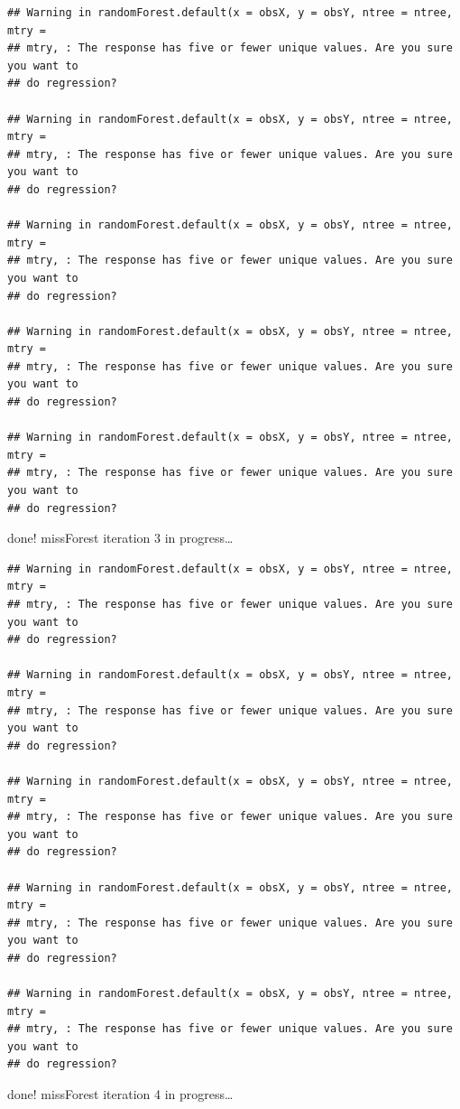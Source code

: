 \documentclass[
]{article}
\begin{document}
\begin{verbatim}
## Warning in randomForest.default(x = obsX, y = obsY, ntree = ntree, mtry =
## mtry, : The response has five or fewer unique values. Are you sure you want to
## do regression?

## Warning in randomForest.default(x = obsX, y = obsY, ntree = ntree, mtry =
## mtry, : The response has five or fewer unique values. Are you sure you want to
## do regression?

## Warning in randomForest.default(x = obsX, y = obsY, ntree = ntree, mtry =
## mtry, : The response has five or fewer unique values. Are you sure you want to
## do regression?

## Warning in randomForest.default(x = obsX, y = obsY, ntree = ntree, mtry =
## mtry, : The response has five or fewer unique values. Are you sure you want to
## do regression?

## Warning in randomForest.default(x = obsX, y = obsY, ntree = ntree, mtry =
## mtry, : The response has five or fewer unique values. Are you sure you want to
## do regression?
\end{verbatim}

done! missForest iteration 3 in progress\ldots{}

\begin{verbatim}
## Warning in randomForest.default(x = obsX, y = obsY, ntree = ntree, mtry =
## mtry, : The response has five or fewer unique values. Are you sure you want to
## do regression?

## Warning in randomForest.default(x = obsX, y = obsY, ntree = ntree, mtry =
## mtry, : The response has five or fewer unique values. Are you sure you want to
## do regression?

## Warning in randomForest.default(x = obsX, y = obsY, ntree = ntree, mtry =
## mtry, : The response has five or fewer unique values. Are you sure you want to
## do regression?

## Warning in randomForest.default(x = obsX, y = obsY, ntree = ntree, mtry =
## mtry, : The response has five or fewer unique values. Are you sure you want to
## do regression?

## Warning in randomForest.default(x = obsX, y = obsY, ntree = ntree, mtry =
## mtry, : The response has five or fewer unique values. Are you sure you want to
## do regression?
\end{verbatim}

done! missForest iteration 4 in progress\ldots{}
\end{document}
